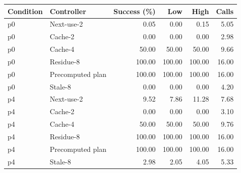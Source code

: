 \begin{longtable}{llrrrr}
\toprule
Condition & Controller & Success (\%) & Low & High & Calls\\
\midrule
\endhead
p0 & Next-use-2 & 0.05 & 0.00 & 0.15 & 5.05\\
p0 & Cache-2 & 0.00 & 0.00 & 0.00 & 2.98\\
p0 & Cache-4 & 50.00 & 50.00 & 50.00 & 9.66\\
p0 & Residue-8 & 100.00 & 100.00 & 100.00 & 16.00\\
p0 & Precomputed plan & 100.00 & 100.00 & 100.00 & 16.00\\
p0 & Stale-8 & 0.00 & 0.00 & 0.00 & 4.20\\
p4 & Next-use-2 & 9.52 & 7.86 & 11.28 & 7.68\\
p4 & Cache-2 & 0.00 & 0.00 & 0.00 & 3.10\\
p4 & Cache-4 & 50.00 & 50.00 & 50.00 & 9.76\\
p4 & Residue-8 & 100.00 & 100.00 & 100.00 & 16.00\\
p4 & Precomputed plan & 100.00 & 100.00 & 100.00 & 16.00\\
p4 & Stale-8 & 2.98 & 2.05 & 4.05 & 5.33\\
\bottomrule
\end{longtable}